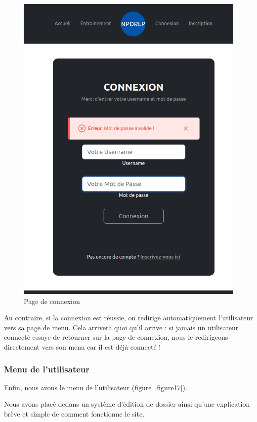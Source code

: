 \documentclass[12pt,french]{article}
\begin{document}
\begin{figure}[H]
\begin{minipage}{.5\textwidth}
		\includegraphics[scale=0.25]{connec2.png}
	\end{minipage}
	\caption{Page de connexion}
	\label{figure16} 
\end{figure}

Au contraire, si la connexion est réussie, on redirige automatiquement l'utilisateur vers sa page de menu. Cela arrivera quoi qu'il arrive : si jamais un utilisateur connecté essaye de retourner sur la page de connexion, nous le redirigeons directement vers son menu car il est déjà connecté !

\subsubsection{Menu de l'utilisateur}

Enfin, nous avons le menu de l'utilisateur (figure~\ref{figure17}).

Nous avons placé dedans un système d'édition de dossier ainsi qu'une explication brève et simple de comment fonctionne le site.
\end{document}
